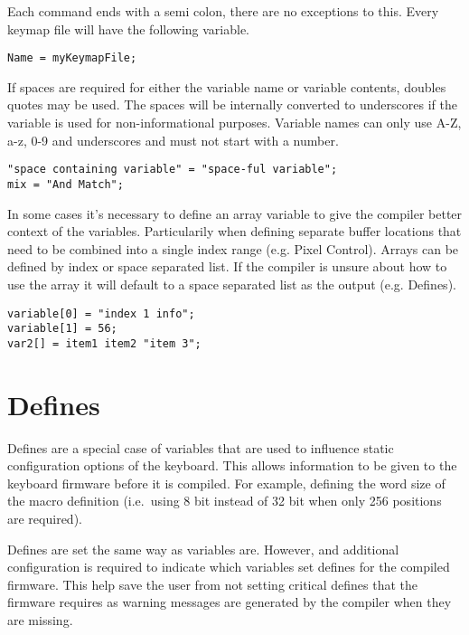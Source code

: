\documentclass{kiibohd-template}
\begin{document}
Each command ends with a semi colon, there are no exceptions to this.
Every keymap file will have the following variable.

\begin{lstlisting}
Name = myKeymapFile;
\end{lstlisting}

If spaces are required for either the variable name or variable contents, doubles quotes may be used.
The spaces will be internally converted to underscores if the variable is used for non-informational purposes.
Variable names can only use A-Z, a-z, 0-9 and underscores and must not start with a number.

\begin{lstlisting}
"space containing variable" = "space-ful variable";
mix = "And Match";
\end{lstlisting}

In some cases it's necessary to define an array variable to give the compiler better context of the variables.
Particularily when defining separate buffer locations that need to be combined into a single index range (e.g. Pixel Control).
Arrays can be defined by index or space separated list.
If the compiler is unsure about how to use the array it will default to a space separated list as the output (e.g. Defines).

\begin{lstlisting}
variable[0] = "index 1 info";
variable[1] = 56;
var2[] = item1 item2 "item 3";
\end{lstlisting}


\section{Defines}
\label{sec:Defines}

Defines are a special case of variables that are used to influence static configuration options of the keyboard.
This allows information to be given to the keyboard firmware before it is compiled.
For example, defining the word size of the macro definition (i.e.\ using 8 bit instead of 32 bit when only 256 positions are required).

Defines are set the same way as variables are.
However, and additional configuration is required to indicate which variables set defines for the compiled firmware.
This help save the user from not setting critical defines that the firmware requires as warning messages are generated by the compiler when they are missing.
\end{document}
